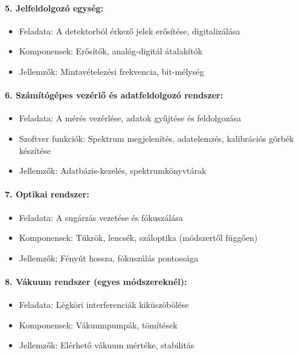 \documentclass[a4paper,12pt]{article}
\begin{document}
\paragraph{5. Jelfeldolgozó egység:} \begin{itemize} \item Feladata: A detektorból érkező jelek erősítése, digitalizálása \item Komponensek: Erősítők, analóg-digitál átalakítók \item Jellemzők: Mintavételezési frekvencia, bit-mélység \end{itemize}

\paragraph{6. Számítógépes vezérlő és adatfeldolgozó rendszer:} \begin{itemize} \item Feladata: A mérés vezérlése, adatok gyűjtése és feldolgozása \item Szoftver funkciók: Spektrum megjelenítés, adatelemzés, kalibrációs görbék készítése \item Jellemzők: Adatbázis-kezelés, spektrumkönyvtárak \end{itemize}

\paragraph{7. Optikai rendszer:} \begin{itemize} \item Feladata: A sugárzás vezetése és fókuszálása \item Komponensek: Tükrök, lencsék, száloptika (módszertől függően) \item Jellemzők: Fényút hossza, fókuszálás pontossága \end{itemize}

\paragraph{8. Vákuum rendszer (egyes módszereknél):} \begin{itemize} \item Feladata: Légköri interferenciák kiküszöbölése \item Komponensek: Vákuumpumpák, tömítések \item Jellemzők: Elérhető vákuum mértéke, stabilitás \end{itemize}
\end{document}
